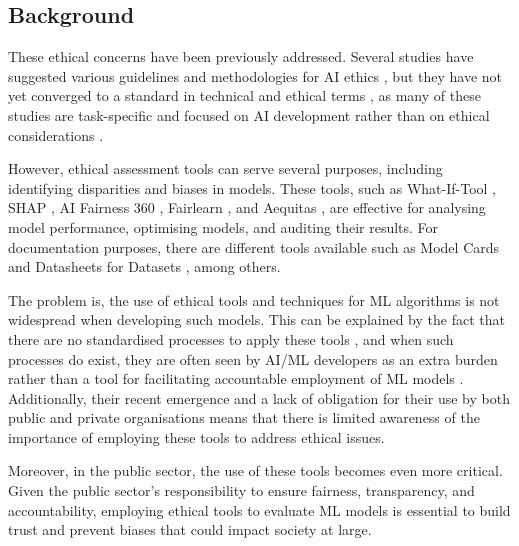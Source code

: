 \documentclass[twoside,11pt]{article}
\begin{document}
\subsection{Background}

These ethical concerns have been previously addressed. Several studies have suggested various guidelines and methodologies for AI ethics ,  but they have not yet converged to a standard in technical and ethical terms ,  as many of these studies are task-specific and focused on AI development rather than on ethical considerations .

However, ethical assessment tools can serve several purposes, including identifying disparities and biases in models. These tools, such as What-If-Tool , SHAP , AI Fairness 360 , Fairlearn , and Aequitas , are effective for analysing model performance, optimising models, and auditing their results. For documentation purposes, there are different tools available such as Model Cards  and Datasheets for Datasets , among others. 

The problem is, the use of ethical tools and techniques for ML algorithms is not widespread when developing such models. This can be explained by the fact that there are no standardised processes to apply these tools , and when such processes do exist, they are often seen by AI/ML developers as an extra burden rather than a tool for facilitating accountable employment of ML models . Additionally, their recent emergence and a lack of obligation for their use by both public and private organisations means that there is limited awareness of the importance of employing these tools to address ethical issues.

Moreover, in the public sector, the use of these tools becomes even more critical. Given the public sector’s responsibility to ensure fairness, transparency, and accountability, employing ethical tools to evaluate ML models is essential to build trust and prevent biases that could impact society at large.
\end{document}
